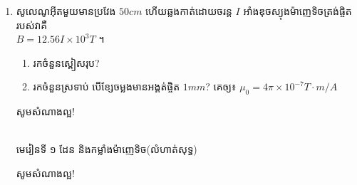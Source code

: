 \documentclass[12pt, a4paper]{article}
\begin{document}
\begin{enumerate}[m]
	\item សូលេណូអ៊ីតមួយមានប្រវែង $50cm$ ហើយឆ្លងកាត់ដោយចរន្ត $I$ អាំងឌុចស្យុងម៉ាញេទិចត្រង់ផ្ចិតរបស់វាគឺ \\$B=12.56I\times10^{3}T$ ។
	\begin{enumerate}[k]
		\item រកចំនួនស្ពៀសរុប?
		\item រកចំនួនស្រទាប់ បើខ្សែចម្លងមានអង្គត់ផ្ចិត $1mm$? គេឲ្យ៖ $\mu_0=4\pi\times10^{-7}T\cdot m/A$
	\end{enumerate}
	\begin{center}
		\sffamily\color{black}
		សូមសំណាងល្អ!
	\end{center}\newpage
	\begin{center}
		\sffamily\color{black}
		\\
		មេរៀនទី​ ១ ដែន និងកម្លាំងម៉ាញេទិច(លំហាត់សុទ្ធ)
	\end{center}
	\begin{center}
		\sffamily\color{black}
		សូមសំណាងល្អ!
	\end{center}\newpage
\end{enumerate}
\end{document}
